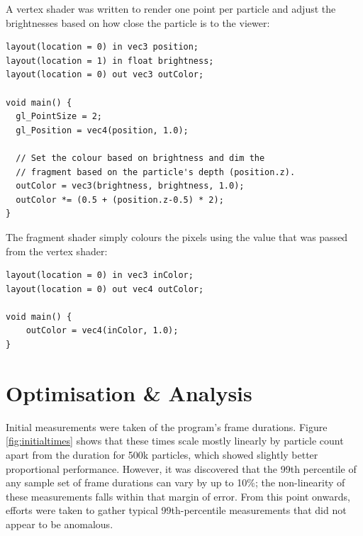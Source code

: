 \documentclass[11pt, a4paper, twocolumn]{article}
\begin{document}
A vertex shader was written to render one point per particle and adjust the brightnesses based on how close the particle is to the viewer:

\begin{verbatim}
layout(location = 0) in vec3 position;
layout(location = 1) in float brightness;
layout(location = 0) out vec3 outColor;

void main() {
  gl_PointSize = 2;
  gl_Position = vec4(position, 1.0);

  // Set the colour based on brightness and dim the
  // fragment based on the particle's depth (position.z).
  outColor = vec3(brightness, brightness, 1.0);
  outColor *= (0.5 + (position.z-0.5) * 2);
}
\end{verbatim}

The fragment shader simply colours the pixels using the value that was passed from the vertex shader:

\begin{verbatim}
layout(location = 0) in vec3 inColor;
layout(location = 0) out vec4 outColor;

void main() {
    outColor = vec4(inColor, 1.0);
}
\end{verbatim}

\section{Optimisation \& Analysis}


Initial measurements were taken of the program's frame durations. Figure \ref{fig:initialtimes} shows that these times scale mostly linearly by particle count apart from the duration for 500k particles, which showed slightly better proportional performance. However, it was discovered that the 99th percentile of any sample set of frame durations can vary by up to 10\%; the non-linearity of these measurements falls within that margin of error. From this point onwards, efforts were taken to gather typical 99th-percentile measurements that did not appear to be anomalous.
\end{document}
